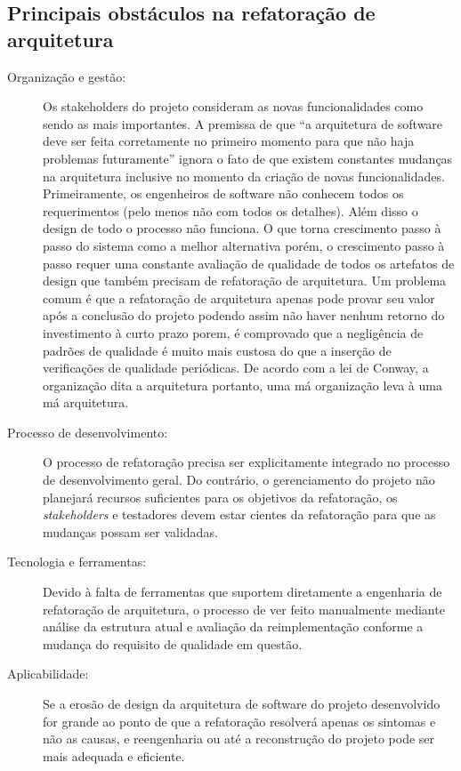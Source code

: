 \subsection{Principais obstáculos na refatoração de arquitetura}
\begin{description}
\item[Organização e gestão:] 
Os stakeholders do projeto consideram as novas funcionalidades como sendo as mais importantes.
A premissa de que “a arquitetura de software deve ser feita corretamente no primeiro momento para que não haja problemas futuramente” ignora o fato de que existem constantes mudanças na arquitetura inclusive no momento da criação de novas funcionalidades.
Primeiramente, os engenheiros de software não conhecem todos os requerimentos (pelo menos não com todos os detalhes). 
Além disso o design de todo o processo não funciona. O que torna crescimento passo à passo do sistema como a melhor alternativa porém, o crescimento passo à passo requer uma constante avaliação de qualidade de todos os artefatos de design que também precisam de refatoração de arquitetura. Um problema comum é que a refatoração de arquitetura apenas pode provar seu valor após a conclusão do projeto podendo assim não haver nenhum retorno do investimento à curto prazo porem, é comprovado que a negligência de padrões de qualidade é muito mais custosa do que a inserção de verificações de qualidade periódicas. De acordo com a lei de Conway, a organização dita a arquitetura portanto, uma má organização leva à uma má arquitetura.

\item[Processo de desenvolvimento:]
O processo de refatoração precisa ser explicitamente integrado no processo de desenvolvimento geral. Do contrário, o gerenciamento do projeto não planejará recursos suficientes para os objetivos da refatoração,
os \textit{stakeholders} e testadores devem estar cientes da refatoração para que as mudanças possam ser validadas.

\item[Tecnologia e ferramentas:]
Devido à falta de ferramentas que suportem diretamente a engenharia de refatoração de arquitetura, o processo de ver feito manualmente mediante análise da estrutura atual e avaliação da reimplementação conforme a mudança do requisito de qualidade em questão.

\item[Aplicabilidade:]
Se a erosão de design da arquitetura de software do projeto desenvolvido for grande ao ponto de que a refatoração resolverá apenas os sintomas e não as causas, e reengenharia ou até a reconstrução do projeto pode ser mais adequada e eficiente.
\end{description}


